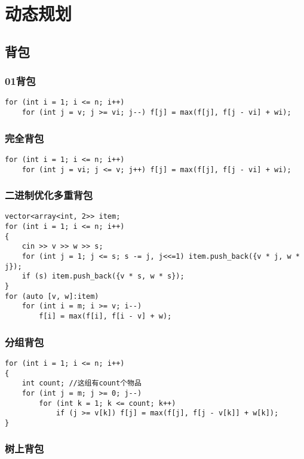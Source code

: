 \documentclass[a4paper, fontset=none]{ctexart}
\begin{document}
\section{动态规划}
\subsection{背包}
\subsubsection{01背包}

\begin{verbatim}
for (int i = 1; i <= n; i++)
    for (int j = v; j >= vi; j--) f[j] = max(f[j], f[j - vi] + wi);
\end{verbatim}
\subsubsection{完全背包}

\begin{verbatim}
for (int i = 1; i <= n; i++)
    for (int j = vi; j <= v; j++) f[j] = max(f[j], f[j - vi] + wi);
\end{verbatim}

\subsubsection{二进制优化多重背包}

\begin{verbatim}
vector<array<int, 2>> item;
for (int i = 1; i <= n; i++)
{
    cin >> v >> w >> s;
    for (int j = 1; j <= s; s -= j, j<<=1) item.push_back({v * j, w * j});
    if (s) item.push_back({v * s, w * s});
}
for (auto [v, w]:item)
    for (int i = m; i >= v; i--)
        f[i] = max(f[i], f[i - v] + w);
\end{verbatim}
\subsubsection{分组背包}

\begin{verbatim}
for (int i = 1; i <= n; i++)
{
    int count; //这组有count个物品
    for (int j = m; j >= 0; j--)
        for (int k = 1; k <= count; k++)
            if (j >= v[k]) f[j] = max(f[j], f[j - v[k]] + w[k]);
}
\end{verbatim}
\subsubsection{树上背包}
\end{document}
